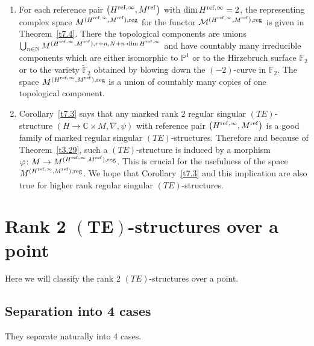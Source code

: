 \documentclass[10pt,a4paper]{amsart}
\numberwithin{equation}{section}
\numberwithin{figure}{section}
\newcommand{\N}{{\mathbb N}}
\newcommand{\C}{{\mathbb C}}
\renewcommand{\P}{{\mathbb P}}
\newcommand{\F}{{\mathbb F}}
\newcommand{\MM}{{\mathcal M}}
\newcommand{\www}{\widetilde}
\newcommand{\nnn}{\nabla}
\begin{document}
\begin{Remarks}%
\quad
\begin{enumerate}\itemsep=0pt
\item[$(i)$] For each reference pair $\big(H^{{\rm ref},\infty},M^{\rm ref}\big)$
with $\dim H^{{\rm ref},\infty}=2$,
the representing complex space
$M^{(H^{{\rm ref},\infty},M^{\rm ref}),{\rm reg}}$
for the functor $\MM^{(H^{{\rm ref},\infty},M^{\rm ref}),{\rm reg}}$
is given in Theorem~\ref{t7.4}.
There the topological components are unions
$\bigcup_{n\in\N}M^{(H^{{\rm ref},\infty},M^{\rm ref}),r+n,N+n\cdot\dim H^{{\rm ref},\infty}}$
and have countably many irreducible components which are either isomorphic
to $\P^1$ or to the Hirzebruch surface $\F_2$ or to the variety $\www\F_2$
obtained by blowing down the $(-2)$-curve in $\F_2$.
The space
$M^{(H^{{\rm ref},\infty},M^{\rm ref}),{\rm reg}}$ is a union of
countably many copies of one topological component.

\item[$(ii)$] Corollary~\ref{t7.3} says that any marked rank $2$
regular singular $(TE)$-structure $(H\to\C\times M,\nnn,\psi)$
with reference pair $\big(H^{{\rm ref},\infty},M^{\rm ref}\big)$ is
a good family of marked regular singular $(TE)$-structures.
Therefore and because of Theorem~\ref{t3.29},
such a $(TE)$-structure is induced by a morphism
$\varphi\colon M\to M^{(H^{{\rm ref},\infty},M^{\rm ref}),{\rm reg}}$.
This is crucial for the usefulness of the
space $M^{(H^{{\rm ref},\infty},M^{\rm ref}),{\rm reg}}$.
We hope that Corollary~\ref{t7.3} and this implication
are also true for higher rank regular singular
$(TE)$-structures.
\end{enumerate}
\end{Remarks}

\section[Rank 2 $(TE)$-structures over a point]{Rank 2 $\boldsymbol{(TE)}$-structures over a point}\label{c4}

Here we will classify the rank $2$ $(TE)$-structures over
a point.

\subsection{Separation into 4 cases}%
They separate naturally into 4 cases.
\end{document}
